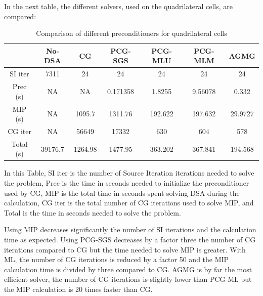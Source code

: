 In the next table, the different solvers, used on the quadrilateral cells, 
are compared:
\begin{table}[H]
\begin{center}
\caption{Comparison of different preconditioners for quadrilateral cells}
\begin{tabular}{|c|c|c|c|c|c|c|}
\hline
& No-DSA & CG & PCG-SGS &  PCG-MLU & PCG-MLM & AGMG\\
\hline
SI iter   & 7311    & 24      & 24       & 24      & 24      & 24      \\
Prec (s)  & NA      & NA      & 0.171358 & 1.8255  & 9.56078 & 0.332   \\
MIP (s)   & NA      & 1095.7  & 1311.76  & 192.622 & 197.632 & 29.9727 \\
CG iter   & NA      & 56649   & 17332    & 630     & 604     & 578     \\
Total (s) & 39176.7 & 1264.98 & 1477.95  & 363.202 & 367.841 & 194.568 \\
\hline
\end{tabular}
\end{center}
\end{table}
In this Table, SI iter is the number of Source Iteration iterations 
needed to solve the problem, Prec is the time in seconds needed to
initialize the preconditioner used by CG, MIP is the total time in
seconds spent solving DSA during the calculation, CG iter is the total number 
of CG iterations used to solve MIP, and Total is the time in
seconds needed to solve the problem.

Using MIP decreases significantly the number of SI iterations and the
calculation time as expected. Using PCG-SGS decreases by a 
factor three the number of CG iterations compared to CG but the time 
needed to solve MIP is greater. With ML, the number of CG iterations is 
reduced by a factor 50 and the MIP calculation time is divided by three 
compared to CG. AGMG is by far the most efficient solver, the number of 
CG iterations is slightly lower than PCG-ML but the MIP calculation is 20 
times faster than CG.

